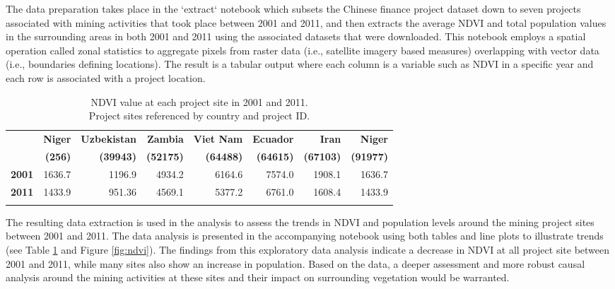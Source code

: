 \documentclass[a4paper]{article}
\begin{document}
The data preparation takes place in the `extract` notebook which subsets the Chinese finance project dataset down to seven projects associated with mining activities that took place between 2001 and 2011, and then extracts the average NDVI and total population values in the surrounding areas in both 2001 and 2011 using the associated datasets that were downloaded.  This notebook employs a spatial operation called zonal statistics\citep{Goodman2019} to aggregate pixels from raster data (i.e., satellite imagery based measures) overlapping with vector data (i.e., boundaries defining locations). The result is a tabular output where each column is a variable such as NDVI in a specific year and each row is associated with a project location.


\begin{table}[ht]
\small
\centering
\caption{
    \small
    NDVI value at each project site in 2001 and 2011. \\ Project sites referenced by country and project ID.
}
\begin{tabular}{r|rrrrrrr}
\hline
\textbf{} & \textbf{Niger} & \textbf{Uzbekistan} & \textbf{Zambia} & \textbf{Viet Nam} & \textbf{Ecuador} & \textbf{Iran} & \textbf{Niger} \\
\textbf{} & \textbf{(256)} & \textbf{(39943)} & \textbf{(52175)} & \textbf{(64488)} & \textbf{(64615)} & \textbf{(67103)} & \textbf{(91977)} \\
\hline
\textbf{2001} & 1636.7 & 1196.9 & 4934.2 & 6164.6 & 7574.0 & 1908.1 & 1636.7 \\
\textbf{2011} & 1433.9 & 951.36 & 4569.1 & 5377.2 & 6761.0 & 1608.4 & 1433.9 \\
\label{tab:ndvi}
\end{tabular}
\end{table}


The resulting data extraction is used in the analysis to assess the trends in NDVI and population levels around the mining project sites between 2001 and 2011. The data analysis is presented in the accompanying notebook using both tables and line plots to illustrate trends (see Table \ref{tab:ndvi} and Figure \ref{fig:ndvi}). The findings from this exploratory data analysis indicate a decrease in NDVI at all project site between 2001 and 2011, while many sites also show an increase in population. Based on the data, a deeper assessment and more robust causal analysis around the mining activities at these sites and their impact on surrounding vegetation would be warranted.
\end{document}
